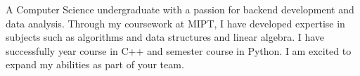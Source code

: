 A Computer Science undergraduate with a passion for backend development and data analysis.
Through my coursework at MIPT, I have developed expertise in subjects such as algorithms and data structures and linear algebra. 
I have successfully year course in C++ and semester course in Python.
I am excited to expand my abilities as part of your team.
